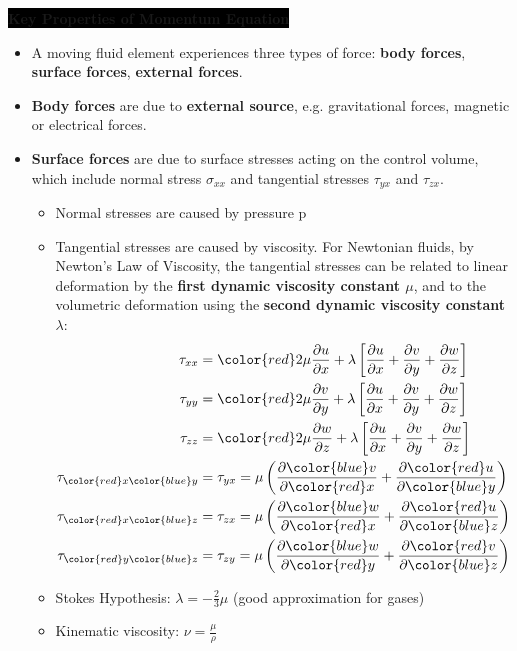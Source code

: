 \colorbox{black}{\textbf{\color{white}Key Properties of Momentum Equation}}
\begin{itemize}
    \item A moving fluid element experiences three types of force: \textbf{\color{blue}body forces}, \textbf{\color{red}surface forces}, \textbf{external forces}.
    \item \textbf{\color{blue}Body forces} are due to \textbf{\color{teal}external source}, e.g. gravitational forces, magnetic or electrical forces.
    \item \textbf{\color{red}Surface forces} are due to surface stresses acting on the control volume, which include normal stress $\sigma_{xx}$ and tangential stresses $\tau_{yx}$ and $\tau_{zx}$. 
    \begin{itemize}
        \item Normal stresses are caused by pressure p
        \item Tangential stresses are caused by viscosity. For Newtonian fluids, by Newton's Law of Viscosity, the tangential stresses can be related to linear deformation by the \textbf{\color{orange}first dynamic viscosity constant $\mu$}, and to the volumetric deformation using the \textbf{\color{orange}second dynamic viscosity constant $\lambda$}:
        \begin{align*}
            \tau_{xx} &= {\color{red}2 \mu \frac{\partial u}{\partial x} }+ \lambda \left[ \frac{\partial u}{\partial x} + \frac{\partial v}{\partial y} + \frac{\partial w}{\partial z} \right] \\
            \tau_{yy} &= {\color{red}2 \mu \frac{\partial v}{\partial y}} + \lambda \left[ \frac{\partial u}{\partial x} + \frac{\partial v}{\partial y} + \frac{\partial w}{\partial z} \right] \\
            \tau_{zz} &= {\color{red}2 \mu \frac{\partial w}{\partial z} } + \lambda \left[ \frac{\partial u}{\partial x} + \frac{\partial v}{\partial y} + \frac{\partial w}{\partial z} \right] \\
            \tau_{{\color{red}x}{\color{blue}y}} &= \tau_{yx} = \mu \left( \frac{\partial {\color{blue}v}}{\partial {\color{red}x}} + \frac{\partial {\color{red}u}}{\partial {\color{blue}y}} \right) \\
            \tau_{{\color{red}x}{\color{blue}z}} &= \tau_{zx} = \mu \left( \frac{\partial {\color{blue}w}}{\partial {\color{red}x}} + \frac{\partial {\color{red}u}}{\partial {\color{blue}z}} \right) \\
            \tau_{{\color{red}y}{\color{blue}z}} &= \tau_{zy} = \mu \left( \frac{\partial {\color{blue}w}}{\partial {\color{red}y}} + \frac{\partial {\color{red}v}}{\partial {\color{blue}z}} \right)
        \end{align*}
        \item Stokes Hypothesis: $\lambda = -\frac{2}{3} \mu$ (good approximation for gases)
        \item Kinematic viscosity: $\nu = \frac{\mu}{\rho}$
    \end{itemize}
\end{itemize}



